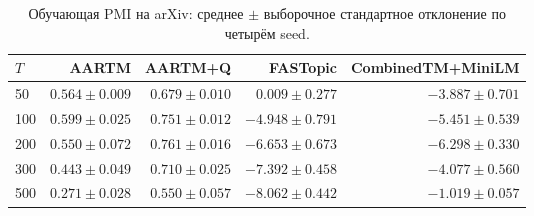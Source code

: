 \begin{table}[H]
\centering
\small
\caption{Обучающая PMI на arXiv: среднее $\pm$ выборочное стандартное отклонение по четырём seed.}
\label{tab:arxiv}
\begin{tabular}{lrrrr}
\toprule
$T$ & AARTM & AARTM+Q & FASTopic & CombinedTM+MiniLM \\
\midrule
50 & $0.564\pm0.009$ & $0.679\pm0.010$ & $0.009\pm0.277$ & $-3.887\pm0.701$ \\
100 & $0.599\pm0.025$ & $0.751\pm0.012$ & $-4.948\pm0.791$ & $-5.451\pm0.539$ \\
200 & $0.550\pm0.072$ & $0.761\pm0.016$ & $-6.653\pm0.673$ & $-6.298\pm0.330$ \\
300 & $0.443\pm0.049$ & $0.710\pm0.025$ & $-7.392\pm0.458$ & $-4.077\pm0.560$ \\
500 & $0.271\pm0.028$ & $0.550\pm0.057$ & $-8.062\pm0.442$ & $-1.019\pm0.057$ \\
\bottomrule
\end{tabular}
\end{table}
